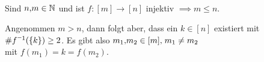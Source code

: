 \documentclass[../ana1.tex]{subfiles}
\begin{document}
\begin{kor}\label{satz:schubfach:kor}\leavevmode \\
	Sind \(n \text{,} m \in\mathbb{N} \) und ist \(f \colon [m] \longrightarrow[n] \) injektiv \(\implies m \leq n \).
\end{kor}
\begin{bew}
	Angenommen \(m > n\), dann folgt aber, dass ein \(k \in [n] \) existiert mit \(\#\inverse{f}(\set{k}) \geq 2 \).
	Es gibt also \(m_1 \text{,} m_2 \in [m] \text{,} \; m_1 \neq m_2 \) \\
	mit \(f(m_1) = k = f(m_2) \).
\end{bew}
\end{document}
